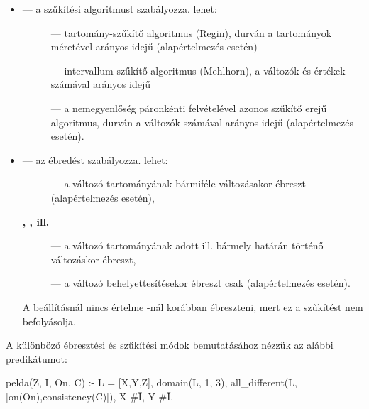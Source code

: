 \begin{itemize}
\item {} --- a szűkítési algoritmust szabályozza.  lehet:
\begin{description}
\item[] --- tartomány-szűkítő algoritmus (Regin), durván a
tartományok méretével arányos idejű (alapértelmezés  esetén)
\item[] --- intervallum-szűkítő algoritmus (Mehlhorn), a
változók és értékek számával arányos idejű
\item[] --- a nemegyenlőség páronkénti felvételével azonos
szűkítő erejű algoritmus, durván a változók számával arányos idejű
(alapértelmezés  esetén).
\end{description}

\item {} --- az ébredést szabályozza.  lehet:
\begin{description}
\item[] --- a változó tartományának bármiféle változásakor
ébreszt (alapértelmezés  esetén),
\item[{\rm \bf {}, , {\rm ill.} }] ---
a változó tartományának adott ill. bármely határán történő változáskor ébreszt,
\item[] --- a változó behelyettesítésekor ébreszt csak (alapértelmezés
 esetén).
\end{description}

A  beállításnál nincs értelme -nál
korábban ébreszteni, mert ez a szűkítést nem befolyásolja.
\end{itemize}

A különböző ébresztési és szűkítési módok bemutatásához nézzük az alábbi predikátumot:

\begin{prologcode}
pelda(Z, I, On, C) :-
     L = [X,Y,Z], domain(L, 1, 3),
     all_different(L, [on(On),consistency(C)]), X #\= I, Y #\= I.
\end{prologcode}

